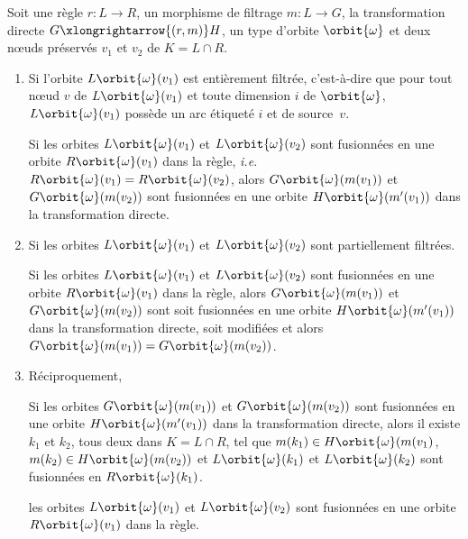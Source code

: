 \begin{proposition}
	\label{prop:base-rule-merge}
	Soit une règle $r : L \longrightarrow R$, un morphisme de filtrage $m : L \rightarrow G$, la transformation directe $G \xlongrightarrow{(r,m)} H$, un type d'orbite $\orbit{\omega}$ et deux n\oe uds préservés $v_1$ et $v_2$ de $K = L \cap R$.

	\begin{enumerate}
		\item Si l'orbite $L\orbit{\omega}(v_1)$ est entièrement
		      filtrée, c'est-à-dire que pour tout n\oe ud $v$ de $L\orbit{\omega}(v_1)$ et toute dimension $i$ de $\orbit{\omega}$,
		      $L\orbit{\omega}(v_1)$ possède un arc étiqueté  $i$ et de source~$v$.

		      Si les orbites $L\orbit{\omega}(v_1)$ et $L\orbit{\omega}(v_2)$ sont fusionnées en une orbite $R\orbit{\omega}(v_1)$ dans la règle, \textit{i.e.} $R\orbit{\omega}(v_1) = R\orbit{\omega}(v_2)$,
		      alors $G\orbit{\omega}(m(v_1))$ et $G\orbit{\omega}(m(v_2))$ sont fusionnées en une orbite $H\orbit{\omega}(m'(v_1))$ dans la
		      transformation directe.

		\item Si les orbites $L\orbit{\omega}(v_1)$ et $L\orbit{\omega}(v_2)$ sont partiellement filtrées.

		      Si les orbites $L\orbit{\omega}(v_1)$ et $L\orbit{\omega}(v_2)$ sont fusionnées en une orbite $R\orbit{\omega}(v_1)$ dans la règle,
		      alors $G\orbit{\omega}(m(v_1))$ et $G\orbit{\omega}(m(v_2))$ sont soit fusionnées en une orbite $H\orbit{\omega}(m'(v_1))$ dans
		      la transformation directe, soit modifiées et alors $G\orbit{\omega}(m(v_1)) = G\orbit{\omega}(m(v_2))$.



		\item Réciproquement,

		      Si les orbites $G\orbit{\omega}(m(v_1))$ et $G\orbit{\omega}(m(v_2))$ sont fusionnées en une orbite $H\orbit{\omega}(m'(v_1))$ dans
		      la transformation directe, alors il existe $k_1$ et $k_2$, tous deux dans $K = L \cap R$, tel que  $m(k_1) \in H\orbit{\omega}(m(v_1)$, $m(k_2) \in H\orbit{\omega}(m(v_2))$
		      et $L\orbit{\omega}(k_1)$ et $L\orbit{\omega}(k_2)$ sont fusionnées en $R\orbit{\omega}(k_1)$.

		      les orbites $L\orbit{\omega}(v_1)$ et $L\orbit{\omega}(v_2)$ sont fusionnées en une orbite
		      $R\orbit{\omega}(v_1)$ dans la règle.
	\end{enumerate}
\end{proposition}

